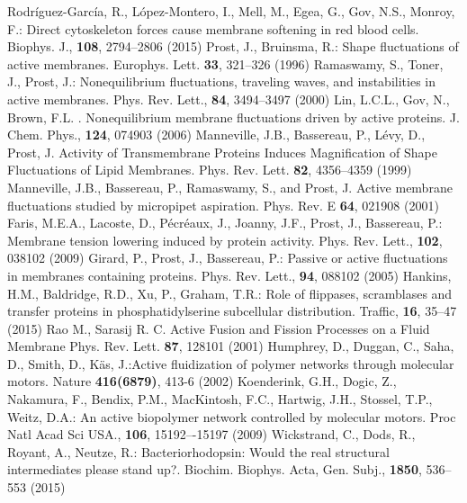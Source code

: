 \documentclass[graybox]{svmult}
\begin{document}
\begin{thebibliography}{99.}
%
Rodr\'{i}guez-Garc\'{i}a, R., L\'{o}pez-Montero, I., Mell, M., Egea, G., Gov, N.S., Monroy, F.: Direct cytoskeleton forces cause membrane softening in red blood cells. Biophys. J., \textbf{108}, 2794--2806 (2015)
%
Prost, J., Bruinsma, R.: Shape fluctuations of active membranes. Europhys. Lett. \textbf{33}, 321--326 (1996)
%
Ramaswamy, S., Toner, J., Prost, J.: Nonequilibrium fluctuations, traveling waves, and instabilities in active membranes. Phys. Rev. Lett., \textbf{84}, 3494--3497 (2000)
%
Lin, L.C.L., Gov, N., Brown, F.L. . Nonequilibrium membrane fluctuations driven by active proteins. J. Chem. Phys., \textbf{124}, 074903 (2006)
%
Manneville, J.B., Bassereau, P., L\'{e}vy, D., Prost, J. Activity of Transmembrane Proteins Induces Magnification of Shape Fluctuations of Lipid Membranes. Phys. Rev. Lett. \textbf{82}, 4356--4359 (1999)
%
Manneville, J.B., Bassereau, P., Ramaswamy, S., and Prost, J. Active membrane fluctuations studied by micropipet aspiration. Phys. Rev. E \textbf{64}, 021908 (2001)
%
Faris, M.E.A., Lacoste, D., P\'{e}cr\'{e}aux, J., Joanny, J.F., Prost, J., Bassereau, P.: Membrane tension lowering induced by protein activity. Phys. Rev. Lett., \textbf{102}, 038102 (2009)
%
Girard, P., Prost, J., Bassereau, P.: Passive or active fluctuations in membranes containing proteins. Phys. Rev. Lett., \textbf{94}, 088102 (2005)
%
Hankins, H.M., Baldridge, R.D., Xu, P., Graham, T.R.: Role of flippases, scramblases and transfer proteins in phosphatidylserine subcellular distribution. Traffic, \textbf{16}, 35--47 (2015)
%
Rao M., Sarasij R. C. Active Fusion and Fission Processes on a Fluid Membrane Phys. Rev. Lett. \textbf{87}, 128101 (2001)
%
Humphrey, D., Duggan, C., Saha, D., Smith, D., Käs, J.:Active fluidization of polymer networks through molecular motors. Nature \textbf{416(6879)}, 413-6 (2002)
%
Koenderink, G.H., Dogic, Z., Nakamura, F., Bendix, P.M., MacKintosh, F.C., Hartwig, J.H., Stossel, T.P., Weitz, D.A.: An active biopolymer network controlled by molecular motors. Proc Natl Acad Sci USA., \textbf{106}, 15192–-15197 (2009)
%
Wickstrand, C., Dods, R., Royant, A., Neutze, R.: Bacteriorhodopsin: Would the real structural intermediates please stand up?. Biochim. Biophys. Acta, Gen. Subj., \textbf{1850}, 536--553 (2015)
%

\end{thebibliography}
\end{document}
